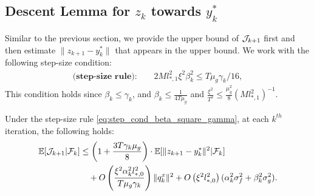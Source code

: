 \subsection{Descent Lemma for $z_k$ towards $y^*_{k}$}

Similar to the previous section, we provide the upper bound of $\mathcal{J}_{k+1}$ first and then estimate $\|z_{k+1}-y_{k}^*\|$ that appears in the upper bound. We work with the following step-size condition:
\begin{align}
    \textbf{(step-size rule):} \qquad 2 Ml_{*,1}^2 \xi^2 \beta_k^2 \le T \mu_g \gamma_k / 16, \label{eq:step_cond_beta_square_gamma}
\end{align}
This condition holds since $\beta_k \le \gamma_k$, and $\beta_k \le \frac{1}{4T\mu_g}$ and $\frac{\xi^2}{T^2} \le \frac{\mu_g^2}{8} (M l_{*,1}^2)^{-1}$.
    
\begin{lemma}
    \label{lemma:z_contraction} 
    Under the step-size rule \eqref{eq:step_cond_beta_square_gamma},    
    at each $k^{th}$ iteration, the following holds:
    \begin{align}
    \mathbb{E}[\mathcal{J}_{k+1}|\mathcal{F}_k] &\le \left(1 + \frac{3T\gamma_k\mu_g}{8} \right) \cdot \mathbb{E}[\|z_{k+1}-y_{k}^*\|^2|\mathcal{F}_k] \nonumber \\
    &\quad + O\left( \frac{\xi^2 \alpha_k^2  l_{*,0}^2}{T \mu_g \gamma_k} \right) \|q_k^x\|^2+  O\left(\xi^2 l_{*,0}^2 \right) (\alpha_k^2 \sigma_f^2 + \beta_k^2 \sigma_g^2) \label{eq:z_contraction}.
\end{align}
\end{lemma}

